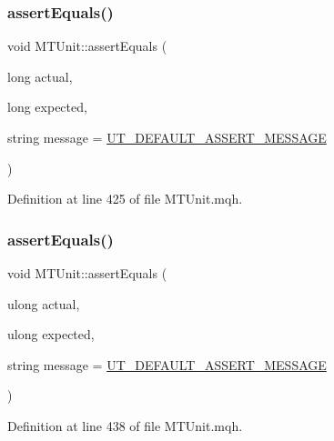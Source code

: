 \subsubsection{\texorpdfstring{assert\+Equals()}{assertEquals()}\hspace{0.1cm}{\footnotesize\ttfamily [8/28]}}
{\footnotesize\ttfamily void M\+T\+Unit\+::assert\+Equals (\begin{DoxyParamCaption}\item[{long}]{actual,  }\item[{long}]{expected,  }\item[{string}]{message = {\ttfamily \mbox{\hyperlink{_m_t_unit_8mqh_a96f5d62188d09039ebc3f443c9120e39}{U\+T\+\_\+\+D\+E\+F\+A\+U\+L\+T\+\_\+\+A\+S\+S\+E\+R\+T\+\_\+\+M\+E\+S\+S\+A\+GE}}} }\end{DoxyParamCaption})}



Definition at line 425 of file M\+T\+Unit.\+mqh.

\mbox{\label{class_m_t_unit_a561341e348d842808630857f662c5b46}} 
\subsubsection{\texorpdfstring{assert\+Equals()}{assertEquals()}\hspace{0.1cm}{\footnotesize\ttfamily [9/28]}}
{\footnotesize\ttfamily void M\+T\+Unit\+::assert\+Equals (\begin{DoxyParamCaption}\item[{ulong}]{actual,  }\item[{ulong}]{expected,  }\item[{string}]{message = {\ttfamily \mbox{\hyperlink{_m_t_unit_8mqh_a96f5d62188d09039ebc3f443c9120e39}{U\+T\+\_\+\+D\+E\+F\+A\+U\+L\+T\+\_\+\+A\+S\+S\+E\+R\+T\+\_\+\+M\+E\+S\+S\+A\+GE}}} }\end{DoxyParamCaption})}



Definition at line 438 of file M\+T\+Unit.\+mqh.

\mbox{\label{class_m_t_unit_a7870b6a845def77ba72750417be38da6}} 
